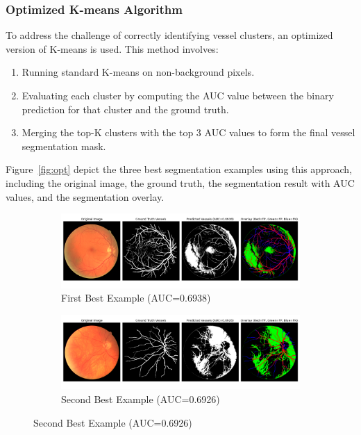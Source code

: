 \documentclass[12pt,letterpaper]{article}
\begin{document}
\subsubsection{Optimized K-means Algorithm}
To address the challenge of correctly identifying vessel clusters, an optimized version of K-means is used. This method involves:
\begin{enumerate}
    \item Running standard K-means on non-background pixels.
    \item Evaluating each cluster by computing the AUC value between the binary prediction for that cluster and the ground truth.
    \item Merging the top-K clusters with the top 3 AUC values to form the final vessel segmentation mask.
\end{enumerate}
Figure~\ref{fig:opt} depict the three best segmentation examples using this approach, including the original image, the ground truth, the segmentation result with AUC values, and the segmentation overlay. 
\begin{figure}[H]
    \centering
    \begin{subfigure}[H]{\textwidth}
        \centering
        \includegraphics[scale=0.35]{Figures/3 Optimized 1st.png}
        \vspace{-0.5cm}
        \caption{First Best Example (AUC=0.6938)}
        \label{fig:opt1}
    \end{subfigure}
    \begin{subfigure}[H]{\textwidth}
        \centering
        \includegraphics[scale=0.35]{Figures/3 Optimized 2nd.png}
        \vspace{-0.5cm}
        \caption{Second Best Example (AUC=0.6926)}
        \label{fig:opt2}
    \end{subfigure}
\end{figure}
\end{document}
